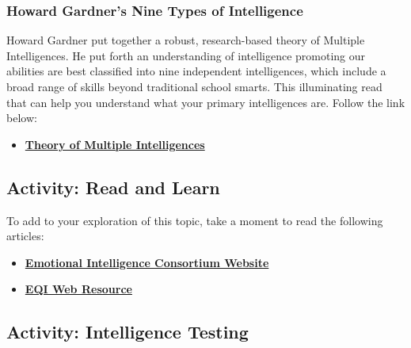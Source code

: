 \documentclass[
]{book}
\providecommand{\tightlist}{%
  \setlength{\itemsep}{0pt}\setlength{\parskip}{0pt}}
\begin{document}
\hypertarget{howard-gardners-nine-types-of-intelligence}{%
\subsubsection*{Howard Gardner's Nine Types of Intelligence}\label{howard-gardners-nine-types-of-intelligence}}

Howard Gardner put together a robust, research-based theory of Multiple Intelligences. He put forth an understanding of intelligence promoting our abilities are best classified into nine independent intelligences, which include a broad range of skills beyond traditional school smarts. This illuminating read that can help you understand what your primary intelligences are. Follow the link below:

\begin{itemize}
\tightlist
\item
  \href{https://www.niu.edu/citl/resources/guides/instructional-guide/gardners-theory-of-multiple-intelligences.shtml}{\textbf{Theory of Multiple Intelligences}}
\end{itemize}

\begin{reflect}
\hypertarget{activity-read-and-learn}{%
\subsection*{Activity: Read and Learn}\label{activity-read-and-learn}}

To add to your exploration of this topic, take a moment to read the following articles:

\begin{itemize}
\item
  \href{http://www.eiconsortium.org/}{\textbf{Emotional Intelligence Consortium Website}}
\item
  \href{http://eqi.org/}{\textbf{EQI Web Resource}}
\end{itemize}
\end{reflect}

\hypertarget{activity-intelligence-testing}{%
\subsection*{Activity: Intelligence Testing}\label{activity-intelligence-testing}}
\end{document}
